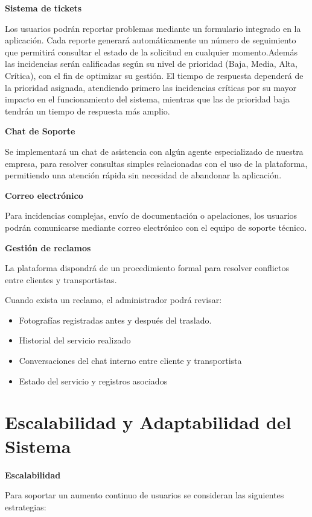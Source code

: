 \noindent\textbf{Sistema de tickets}

Los usuarios podrán reportar problemas mediante un formulario integrado en la aplicación. Cada reporte generará automáticamente un número de seguimiento que permitirá consultar el estado de la solicitud en cualquier momento.Además las incidencias serán calificadas según su nivel de prioridad (Baja, Media, Alta, Crítica), con el fin de optimizar su gestión. El tiempo de respuesta dependerá de la prioridad asignada, atendiendo primero las incidencias críticas por su mayor impacto en el funcionamiento del sistema, mientras que las de prioridad baja tendrán un tiempo de respuesta más amplio. 

\noindent\textbf{Chat de Soporte}

Se implementará un chat de asistencia con algún agente especializado de nuestra empresa, para resolver consultas simples relacionadas con el uso de la plataforma, permitiendo una atención rápida sin necesidad de abandonar la aplicación.

\noindent\textbf{Correo electrónico}

Para incidencias complejas, envío de documentación o apelaciones, los usuarios podrán comunicarse mediante correo electrónico con el equipo de soporte técnico.

\noindent\textbf{Gestión de reclamos}

La plataforma dispondrá de un procedimiento formal para resolver conflictos entre clientes y transportistas.

Cuando exista un reclamo, el administrador podrá revisar:

\begin{itemize}
	\item Fotografías registradas antes y después del traslado.
	\item Historial del servicio realizado
	\item Conversaciones del chat interno entre cliente y transportista
	\item Estado del servicio y registros asociados
\end{itemize}

\section{Escalabilidad y Adaptabilidad del Sistema}

\noindent\textbf{Escalabilidad}

Para soportar un aumento continuo de usuarios se consideran las siguientes estrategias:

